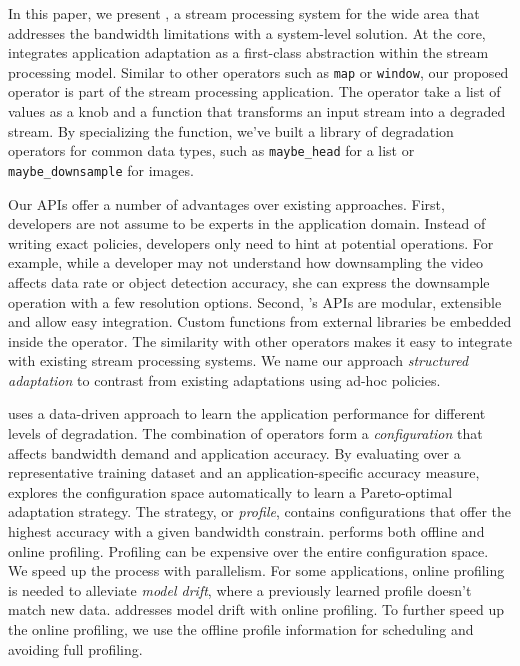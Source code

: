 In this paper, we present \sysname{}, a stream processing system for the wide
area that addresses the bandwidth limitations with a system-level solution. At
the core, \sysname{} integrates application adaptation as a first-class
abstraction within the stream processing model. Similar to other operators such
as \texttt{map} or \texttt{window}, our proposed \maybe{} operator is part of
the stream processing application. The operator take a list of values as a knob
and a function that transforms an input stream into a degraded stream. By
specializing the function, we've built a library of degradation operators for
common data types, such as \texttt{maybe\_head} for a list or
\texttt{maybe\_downsample} for images.

Our APIs offer a number of advantages over existing approaches. First,
developers are not assume to be experts in the application domain. Instead of
writing exact policies, developers only need to hint at potential
operations. For example, while a developer may not understand how downsampling
the video affects data rate or object detection accuracy, she can express the
downsample operation with a few resolution options. Second, \sysname{}'s APIs
are modular, extensible and allow easy integration. Custom functions from
external libraries be embedded inside the operator. The similarity with other
operators makes it easy to integrate with existing stream processing systems.
We name our approach \textit{structured adaptation} to contrast from existing
adaptations using ad-hoc policies.

\sysname{} uses a data-driven approach to learn the application performance for
different levels of degradation. The combination of \maybe{} operators form a
\textit{configuration} that affects bandwidth demand and application
accuracy. By evaluating over a representative training dataset and an
application-specific accuracy measure, \sysname{} explores the configuration
space automatically to learn a Pareto-optimal adaptation strategy. The strategy,
or \textit{profile}, contains configurations that offer the highest accuracy
with a given bandwidth constrain. \sysname{} performs both offline and online
profiling. Profiling can be expensive over the entire configuration space. We
speed up the process with parallelism. For some applications, online profiling
is needed to alleviate \textit{model drift}, where a previously learned profile
doesn't match new data. \sysname{} addresses model drift with online profiling.
To further speed up the online profiling, we use the offline profile information
for scheduling and avoiding full profiling.

